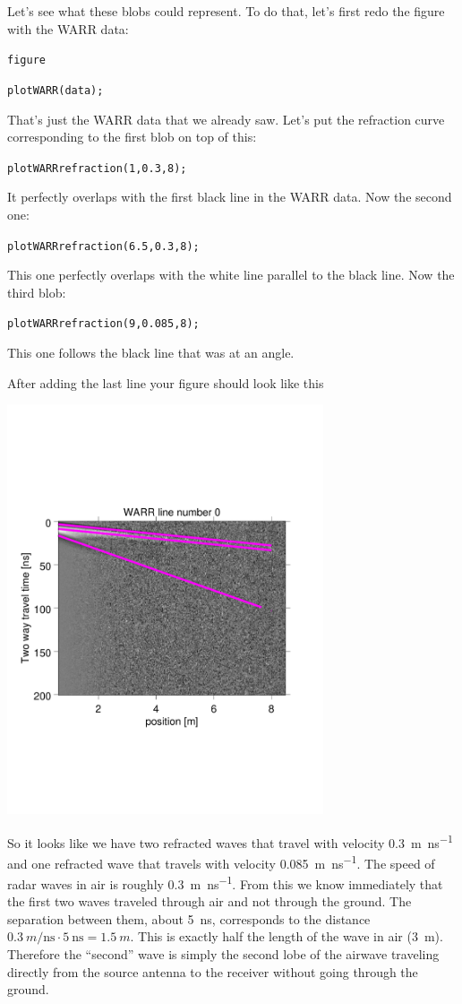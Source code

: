 \documentclass[11pt]{article}
\begin{document}
Let's see what these blobs could represent. To do that, let's first
redo the figure with the WARR data:

\qquad \verb#figure#

\qquad \verb#plotWARR(data);#

That's just the WARR data that we already saw. Let's put the
refraction curve corresponding to the first blob on top of this:
 
\qquad \verb#plotWARRrefraction(1,0.3,8);#

It perfectly overlaps with the first black line in the WARR
data. Now the second one:

\qquad \verb#plotWARRrefraction(6.5,0.3,8);#

This one perfectly overlaps with the white line parallel to the black
line. Now the third blob:

\qquad \verb#plotWARRrefraction(9,0.085,8);#

This one follows the black line that was at an angle.

After adding the last line your figure should look like this
\begin{center}
  \includegraphics[width=0.7\textwidth,trim = 0.9cm 6cm 2cm
    6.5cm,clip]{figures/WARRlines}
\end{center}

So it looks like we have two refracted waves that travel with velocity
\SI{0.3}{m\per\ns} and one refracted wave that travels with velocity
\SI{0.085}{m\per\ns}. The speed of radar waves in air is roughly
\SI{0.3}{m\per\ns}. From this we know immediately that the first two
waves traveled through air and not through the ground. The separation
between them, about \SI{5}{\ns}, corresponds to the distance
$\SI{0.3}{m\per\ns} \cdot \SI{5}{\ns} = \SI{1.5}{m}$. This is exactly
half the length of the wave in air (\SI{3}{m}). Therefore the ``second''
wave is simply the second lobe of the airwave traveling directly from
the source antenna to the receiver without going through the ground.
\end{document}
